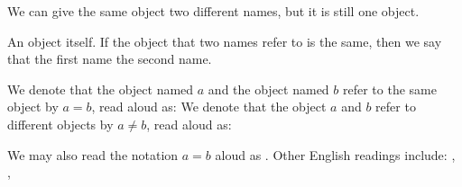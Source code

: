 

We can give the
same object two different
names, but it is still
one object.


An object
 itself.
If the object that two
names refer to is
the same,
then we say
that the first name
the second name.


We denote that
the object named $a$ and
the object named $b$ refer
to the same object
by $a = b$,
read aloud as:
We denote that
the object $a$ and
$b$ refer to different
objects by $a \neq b$,
read aloud as:

We may also read the notation
$a = b$ aloud as .
Other English readings
include: ,
,
